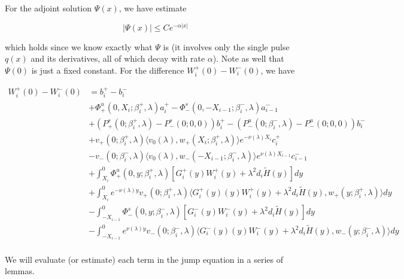 \documentclass[12pt]{article}
\begin{document}
For the adjoint solution $\Psi(x)$, we have estimate 

\begin{equation}
|\Psi(x)| \leq C e^{-\alpha|x|}
\end{equation}

which holds since we know exactly what $\Psi$ is (it involves only the single pulse $q(x)$ and its derivatives, all of which decay with rate $\alpha$). Note as well that $\Psi(0)$ is just a fixed constant. For the difference $W_i^+(0) - W_i^-(0)$, we have

\begin{align*}
W_i^+(0) - W_i^-(0) &= b_i^+ - b_i^- \\
&+ \Phi^u_+(0, X_i; \beta_i^+, \lambda)a_i^+ - \Phi^s_-(0, -X_{i-1}; \beta_i^-, \lambda)a_{i-1}^- \\
&+(P^s_+(0; \beta_i^+, \lambda) - P^s_-(0; 0, 0))b_i^+  - (P^u_-(0; \beta_i^-, \lambda) - P^u_-(0; 0, 0))b_i^- \\
&+ v_+(0; \beta_i^+, \lambda) \langle v_0(\lambda), w_+(X_i; \beta_i^+, \lambda) \rangle e^{-\nu(\lambda)X_i} c_i^+ \\
&- v_-(0; \beta_i^-, \lambda) \langle v_0(\lambda), w_-(-X_{i-1}; \beta_i^-, \lambda) \rangle e^{\nu(\lambda)X_{i-1}} c_{i-1}^- \\
&+ \int_{X_i}^0 \Phi^u_+(0, y; \beta_i^+, \lambda) [ G_i^+(y)W_i^+(y) + \lambda^2 d_i \tilde{H}(y) ] dy \\
&+ \int_{X_i}^0 e^{-\nu(\lambda)y} v_+(0; \beta_i^+, \lambda) \langle G_i^+(y)(y)W_i^+(y) + \lambda^2 d_i \tilde{H}(y), w_+(y; \beta_i^+, \lambda) \rangle dy \\
&- \int_{-X_{i-1}}^0 \Phi^s_-(0, y; \beta_i^-, \lambda) [ G_i^-(y)W_i^-(y) + \lambda^2 d_i \tilde{H}(y) ] dy \\
&- \int_{-X_{i-1}}^0
e^{\nu(\lambda)y} v_-(0; \beta_i^-, \lambda) \langle G_i^-(y)(y)W_i^-(y) + \lambda^2 d_i \tilde{H}(y), w_-(y; \beta_i^-, \lambda) \rangle dy \\
\end{align*}

We will evaluate (or estimate) each term in the jump equation in a series of lemmas.

\end{document}
